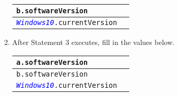 \documentclass[12pt]{article}
\begin{document}
\begin{enumerate}
\begin{table}[!htb]
\begin{tabular}{|l|l| }
\texttt{b.softwareVersion} &     \\ \hline

\texttt{\textcolor{blue}{\textit{Windows10}}.currentVersion}&   \\ \hline


\end{tabular}
\end{table}
	 
\item {} After Statement 3 executes, fill in the values below.
\begin{table}[!htb]
\setlength{\tabcolsep}{5em}
\centering	
\renewcommand{\arraystretch}{1.6}
\begin{tabular}{|l|l| } \hline
\texttt{a.softwareVersion}&   \\ \hline

\texttt{b.softwareVersion} &    \\ \hline

\texttt{\textcolor{blue}{\textit{Windows10}}.currentVersion}&    \\ \hline


\end{tabular}
\end{table}
\end{enumerate}   
\end{document}
